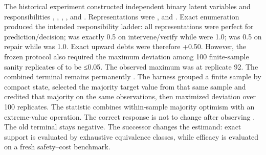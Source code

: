\markdownRendererDocumentBegin
\markdownRendererSectionBegin
{}\markdownRendererInterblockSeparator
{}The historical experiment constructed independent binary latent variables  and responsibilities , , , , and . Representations were ,  and .\markdownRendererInterblockSeparator
{}Exact enumeration produced the intended responsibility ladder: all representations were perfect for prediction/decision;  was exactly 0.5 on intervene/verify while  were 1.0;  was 0.5 on repair while  was 1.0. Exact upward debts were therefore +0.50.\markdownRendererInterblockSeparator
{}However, the frozen protocol also required the maximum deviation among 100 finite-sample sanity replicates of  to be ≤0.05. The observed maximum was  at replicate 92. The combined terminal remains permanently .\markdownRendererInterblockSeparator
{}\markdownRendererSectionBegin
{}\markdownRendererInterblockSeparator
{}The harness grouped a finite sample by compact state, selected the majority target value from that same sample and credited that majority on the same observations, then maximized deviation over 100 replicates. The statistic combines within-sample majority optimism with an extreme-value operation. The correct response is not to change  after observing . The old terminal stays negative. The successor changes the estimand: exact support is evaluated by exhaustive equivalence classes, while efficacy is evaluated on a fresh safety–cost benchmark.
\markdownRendererSectionEnd 
\markdownRendererSectionEnd \markdownRendererDocumentEnd